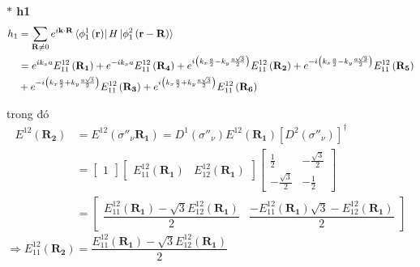 \documentclass{report}
\begin{document}
\textbf{ $\ast$ h1}
\begin{align}
    h_1 & = \sum_{\mathbf{R} \neq 0} e^{i\mathbf{k\cdot R}} \bra*{\phi_1^1 \left(\mathbf{r}\right)} H \ket*{\phi_1^2\left(\mathbf{r}-\mathbf{R}\right)}\nonumber                                                                                                                                                                        \\
        & = e^{i k_x a} E_{11}^{12}\left(\mathbf{R_1}\right) + e^{-i k_x a} E_{11}^{12}\left(\mathbf{R_4}\right) + e^{i \left( k_x \frac{a}{2} - k_y \frac{a\sqrt{3}}{2} \right)} E_{11}^{12}\left(\mathbf{R_2}\right) + e^{-i \left( k_x \frac{a}{2} - k_y \frac{a\sqrt{3}}{2} \right)} E_{11}^{12}\left(\mathbf{R_5}\right) \nonumber \\
        & + e^{-i \left( k_x \frac{a}{2} + k_y \frac{a\sqrt{3}}{2} \right)} E_{11}^{12}\left(\mathbf{R_3}\right) + e^{i \left( k_x \frac{a}{2} + k_y \frac{a\sqrt{3}}{2} \right)} E_{11}^{12}\left(\mathbf{R_6}\right) \nonumber
\end{align}

trong đó
\begin{align}
    E^{12}(\mathbf{R_2})
     & = E^{12}(\sigma''_\nu \mathbf{R_1}) = D^1(\sigma''_\nu) E^{12}(\mathbf{R_1}) \left[ D^2(\sigma''_\nu)\right]^\dagger \nonumber                                                                                                                                                                                    \\
     & = \begin{bmatrix}
             1
         \end{bmatrix}
    \begin{bmatrix}
        E_{11}^{12}(\mathbf{R_1}) & E_{12}^{12}(\mathbf{R_1})
    \end{bmatrix}
    \begin{bmatrix}
        \frac{1}{2}         & -\frac{\sqrt{3}}{2} \\
        -\frac{\sqrt{3}}{2} & -\frac{1}{2}
    \end{bmatrix} \nonumber                                                                                                                                                                                                                                                             \\
     & = \begin{bmatrix}
             \dfrac{ E_{11}^{12}(\mathbf{R_1}) - \sqrt{3} E_{12}^{12}(\mathbf{R_1})}{2} & \dfrac{ - E_{11}^{12}(\mathbf{R_1})\sqrt{3} -  E_{12}^{12}(\mathbf{R_1})}{2}
         \end{bmatrix}
    \nonumber
\end{align}
$\Rightarrow E_{11}^{12}(\mathbf{R_2}) =  \dfrac{ E_{11}^{12}(\mathbf{R_1}) - \sqrt{3} E_{12}^{12}(\mathbf{R_1})}{2} $
\end{document}
